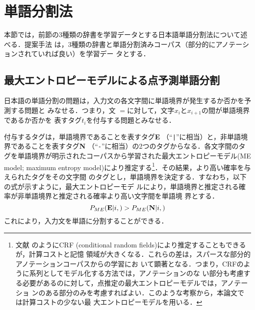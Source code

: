 \documentclass[japanese]{jnlp_JS2.0}
\def\Bdma#1{}
\def\Conc#1#2{}
\begin{document}
\section{単語分割法}
\label{section:AWS}

本節では，前節の3種類の辞書を学習データとする日本語単語分割法について述べる．提案手法
は，3種類の辞書と単語分割済みコーパス（部分的にアノテーションされていれば良い）を学習デー
タとする．


\subsection{最大エントロピーモデルによる点予測単語分割}
\label{subsection:ME}

日本語の単語分割の問題は，入力文の各文字間に単語境界が発生するか否かを予測する問題と
みなせる\cite{文字クラスモデルによる日本語単語分割,日本語単語分割を題材としたサポートベクタマシンの能動学習の実験的研究,教師なし隠れマルコフモデルを利用した最大エントロピータグ付けモデル,Training.Conditional.Random.Fields.Using.Incomplete.Annotations}．つまり，文
$\Bdma{x} = \Conc{x}{m}$に対して，文字$x_{i}$と$x_{i+1}$の間が単語境界であるか否かを
表すタグ$t_{i}$を付与する問題とみなせる．

付与するタグは，単語境界であることを表すタグ{\bf E} （``\verb*+|+''に相当）と，非単語境
界であることを表すタグ{\bf N} （``\verb*+-+''に相当）の2つのタグからなる．各文字間のタ
グを単語境界が明示されたコーパスから学習された最大エントロピーモデル(ME model; maximum entropy model)により推定する\footnote{文献
\cite{日本語単語分割の分野適応のための部分的アノテーションを用いた条件付き確率場の学習}
のようにCRF (conditional random fields)により推定することもできるが，計算コストと記憶
領域が大きくなる．これらの差は，スパースな部分的アノテーションコーパスからの学習にお
いて顕著となる．つまり，CRFのように系列としてモデル化する方法では，アノテーションのな
い部分も考慮する必要があるのに対して，点推定の最大エントロピーモデルでは，アノテーショ
ンのある部分のみを考慮すればよい．このような考察から，本論文では計算コストの少ない最
大エントロピーモデルを用いる．}．その結果，より高い確率を与えられたタグをその文字間
のタグとし，単語境界を決定する．すなわち，以下の式が示すように，最大エントロピーモデ
ルにより，単語境界と推定される確率が非単語境界と推定される確率より高い文字間を単語境
界とする．
\begin{displaymath}
  P_{ME}({\bf E}|i,\Bdma{x}) > P_{ME}({\bf N}|i,\Bdma{x})
\end{displaymath}
これにより，入力文を単語に分割することができる．
\end{document}
